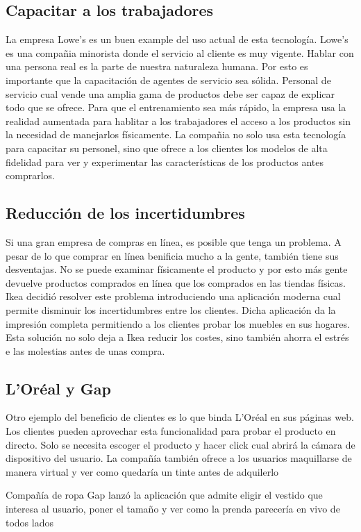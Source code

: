 \documentclass[a4paper,11pt]{scrartcl}
\begin{document}
\subsection{Capacitar a los trabajadores}
La empresa Lowe's es un buen example del uso actual de esta tecnología. Lowe's es una compañia minorista donde el servicio al cliente es muy vigente. Hablar con una persona real es la parte de nuestra naturaleza humana. Por esto es importante que la capacitación de agentes de servicio sea sólida. Personal de servicio cual vende una amplia gama de productos debe ser capaz de explicar todo que se ofrece. Para que el entrenamiento sea más rápido, la empresa usa la realidad aumentada para hablitar a los trabajadores el acceso a los productos sin la necesidad de manejarlos físicamente. La compañia no solo usa esta tecnología para capacitar su personel, sino que ofrece a los clientes los modelos de alta fidelidad para ver y experimentar las características de los productos antes comprarlos.
\subsection{Reducción de los incertidumbres}
Si  una gran empresa de compras en línea, es posible que tenga un problema. A pesar de lo que comprar en línea benificia mucho a la gente, también tiene sus desventajas. No se puede examinar físicamente el producto y por esto más gente devuelve productos comprados en línea que los comprados en las tiendas físicas. Ikea decidió resolver este problema introduciendo una aplicación moderna cual permite disminuir los incertidumbres entre los clientes. Dicha aplicación da la impresión completa permitiendo a los clientes probar los muebles en sus hogares. Esta solución no solo deja a Ikea reducir los costes, sino también ahorra el estrés e las molestias antes de unas compra.

\subsection{L'Oréal y Gap}
Otro ejemplo del beneficio de clientes es lo que binda L'Oréal en sus páginas web. Los clientes pueden aprovechar esta funcionalidad para probar el producto en directo. Solo se necesita escoger el producto y hacer click cual abrirá la cámara de dispositivo del usuario. La compañía también ofrece a los usuarios maquillarse de manera virtual y ver como quedaría un tinte antes de adquilerlo\\
\par Compañía de ropa Gap lanzó la aplicación que admite eligir el vestido que interesa al usuario, poner el tamaño y ver como la prenda parecería en vivo de todos lados
\end{document}
